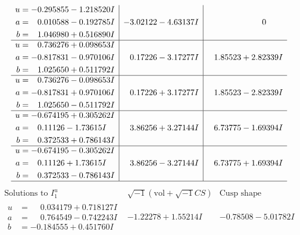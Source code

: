 \documentclass[1p]{elsarticle_modified}
\theoremstyle{definition}
\newcommand{\I}{\sqrt{-1}}
\begin{document}
$$\begin{array}{c|c|c}
\begin{aligned}
u &= -0.295855 - 1.218520 I \\
a &= \phantom{-}0.010588 - 0.192785 I \\
b &= \phantom{-}1.046980 + 0.516890 I\end{aligned}
 & -3.02122 - 4.63137 I & \phantom{-0.000000 } 0 \\ \hline\begin{aligned}
u &= \phantom{-}0.736276 + 0.098653 I \\
a &= -0.817831 - 0.970106 I \\
b &= \phantom{-}1.025650 + 0.511792 I\end{aligned}
 & \phantom{-}0.17226 - 3.17277 I & \phantom{-}1.85523 + 2.82339 I \\ \hline\begin{aligned}
u &= \phantom{-}0.736276 - 0.098653 I \\
a &= -0.817831 + 0.970106 I \\
b &= \phantom{-}1.025650 - 0.511792 I\end{aligned}
 & \phantom{-}0.17226 + 3.17277 I & \phantom{-}1.85523 - 2.82339 I \\ \hline\begin{aligned}
u &= -0.674195 + 0.305262 I \\
a &= \phantom{-}0.11126 - 1.73615 I \\
b &= \phantom{-}0.372533 + 0.786143 I\end{aligned}
 & \phantom{-}3.86256 + 3.27144 I & \phantom{-}6.73775 - 1.69394 I \\ \hline\begin{aligned}
u &= -0.674195 - 0.305262 I \\
a &= \phantom{-}0.11126 + 1.73615 I \\
b &= \phantom{-}0.372533 - 0.786143 I\end{aligned}
 & \phantom{-}3.86256 - 3.27144 I & \phantom{-}6.73775 + 1.69394 I\\
 \hline 
 \end{array}$$\newpage$$\begin{array}{c|c|c}  
\text{Solutions to }I^u_{1}& \I (\text{vol} + \sqrt{-1}CS) & \text{Cusp shape}\\
 \hline 
\begin{aligned}
u &= \phantom{-}0.034179 + 0.718127 I \\
a &= \phantom{-}0.764549 - 0.742243 I \\
b &= -0.184555 + 0.451760 I\end{aligned}
 & -1.22278 + 1.55214 I & -0.78508 - 5.01782 I \\ \hline\begin{aligned}

\end{aligned}
\end{array}$$
\end{document}
